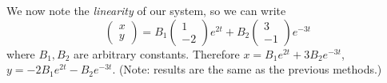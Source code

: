 \documentclass[12pt]{report}
\theoremstyle{definition}
\begin{document}
\begin{enumerate}[label = (\arabic*)]
      We now note the \emph{linearity} of our system, so we can write\[
          \begin{pmatrix}
                  x \\
                  y
          \end{pmatrix} = B_1\begin{pmatrix}
                  1 \\
                  -2
          \end{pmatrix} e^{2t} + B_2\begin{pmatrix}
                  3 \\
                  -1
          \end{pmatrix} e^{-3t}
      \]where $B_1, B_2$ are arbitrary constants.
      Therefore $x = B_1 e^{2t} + 3B_2 e^{-3t}$,
      $y = -2B_{1}e^{2t} - B_2 e^{-3t}$.
      (Note: results are the same as the previous methods.)
\end{enumerate}
\end{document}

